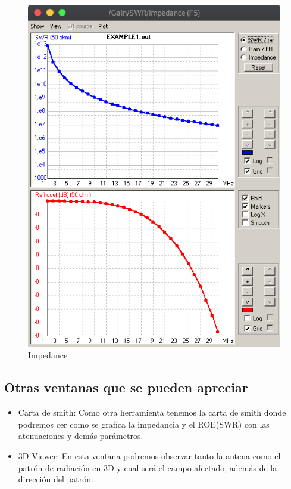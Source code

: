 \documentclass[11pt,a4paper]{article}
\begin{document}
\begin{figure}[H]
    \centering
    \includegraphics[scale=0.35]{images/Interfaz/impedancia.png}
    \caption{Impedance}
    \label{fig4:Impedance}
\end{figure}

\subsection{Otras ventanas que se pueden apreciar} \label{secc:2.5}

\begin{itemize}
    \item Carta de smith: Como otra herramienta tenemos la carta de smith donde podremos cer como se graf\'ica la impedancia y el ROE(SWR) con las atenuaciones y dem\'as par\'ametros.
    \item 3D Viewer: En esta ventana podremos observar tanto la antena como el patr\'on de radiaci\'on en 3D y cual ser\'a el campo afectado, adem\'as de la direcci\'on del patr\'on.
\end{itemize}
\end{document}
